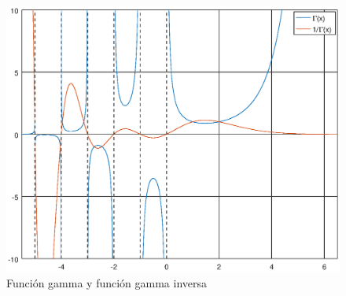 \begin{figure}[htbp]
	\begin{center}
		\includegraphics[scale=0.7]{figura1_5.eps}
	\end{center}
\caption{Función gamma y función gamma inversa}
\label{fig1_5}
\end{figure}

